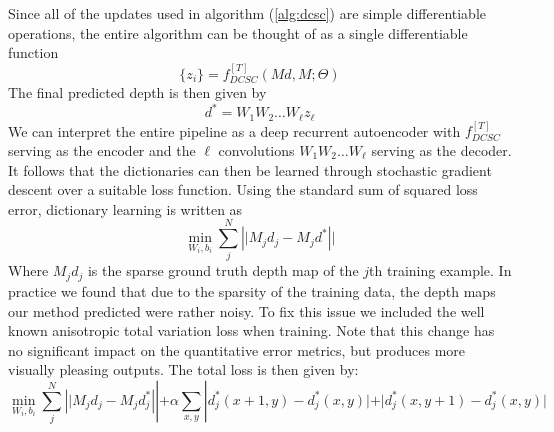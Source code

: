 Since all of the updates used in algorithm (\ref{alg:dcsc}) are simple differentiable operations, the entire algorithm can be thought of as a single differentiable function
\begin{equation}
  \label{eq:7}
  \{ z_i \} = f^{[T]}_{DCSC}(Md, M; \Theta)
\end{equation}
The final predicted depth is then given by
\begin{equation}
  \label{eq:8}
  d^{*} = W_1W_2\ldots W_{\ell}z_{\ell}
\end{equation}
We can interpret the entire pipeline as a deep recurrent autoencoder with  $f^{[T]}_{DCSC}$ serving as the encoder and the $\ell$ convolutions $W_1W_2\ldots W_{\ell}$ serving as the decoder. It follows that the dictionaries can then be learned through stochastic gradient descent over a suitable loss function. Using the standard sum of squared loss error, dictionary learning is written as
\begin{equation}
  \label{eq:9}
  \min_{W_i, b_i} \sum_j^{N}\left||M_{j}d_j - M_jd^{*}\right||
\end{equation}
Where $M_jd_j$ is the sparse ground truth depth map of the $j$th training example. In practice we found that due to the sparsity of the training data, the depth maps our method predicted were rather noisy. To fix this issue we included the well known anisotropic total variation loss when training. Note that this change has no significant impact on the quantitative error metrics, but produces more visually pleasing outputs. The total loss is then given by:
\begin{equation}
  \label{eq:9}
  \min_{W_i, b_i} \sum_j^{N}\left||M_{j}d_j - M_jd_j^{*}\right|| + \alpha\sum_{x,y} |d_j^*(x+1, y) - d_j^*(x, y)| + |d_j^*(x, y+1) - d_j^*(x, y)|
\end{equation}